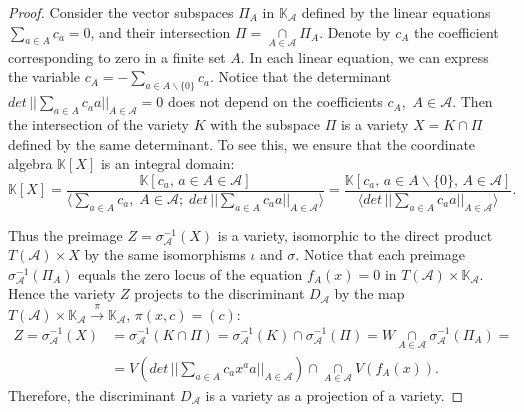 \documentclass[10pt,a4paper]{amsart}
\begin{document}
\begin{proof}
Consider the vector subspaces $\Pi_{A}$ in $\mathbb{K}_{\mathscr{A}}$
defined by the linear equations $\underset{a\in A}{\sum}c_{a}=0$,
and their intersection $\Pi=\underset{A\in\mathscr{A}}{\cap}\Pi_{A}$.
Denote by $c_{A}$ the coefficient corresponding to zero in a finite
set $A$. In each linear equation, we can express the variable $c_{A}=-\underset{a\in A\backslash\{0\}}{\sum}c_{a}.$
Notice that the determinant $det\,||\underset{a\in A}{\sum}c_{a}a||_{A\in\mathscr{A}}=0$
does not depend on the coefficients $c_{A},$ $A\in\mathscr{A}$.
Then the intersection of the variety $K$ with the subspace $\Pi$
is a variety $X=K\cap\Pi$ defined by the same determinant. To see
this, we ensure that the coordinate algebra $\mathbb{K}[X]$ is an
integral domain:
\[
\mathbb{K}[X]=\frac{\mathbb{K}[c_{a},\,a\in A\in\mathscr{A}]}{\langle\underset{a\in A}{\sum}c_{a},\;A\in\mathscr{A};\;det\,||\underset{a\in A}{\sum}c_{a}a||_{A\in\mathscr{A}}\rangle}=\frac{\mathbb{K}[c_{a},\,a\in A\backslash\{0\},\,A\in\mathscr{A}]}{\langle det\,||\underset{a\in A}{\sum}c_{a}a||_{A\in\mathscr{A}}\rangle}.
\]

Thus the preimage $Z=\sigma_{\mathscr{A}}^{-1}(X)$ is a variety,
isomorphic to the direct product $T(\mathscr{A})\times X$ by the
same isomorphisms $\iota$ and $\sigma$. Notice that each preimage
$\sigma_{\mathscr{A}}^{-1}(\Pi_{A})$ equals the zero locus of the
equation $f_{A}(x)=0$ in $T(\mathscr{A})\times\mathbb{K}_{\mathscr{A}}$.
Hence the variety $Z$ projects to the discriminant $D_{\mathscr{A}}$
by the map $T(\mathscr{A})\times\mathbb{K}_{\mathscr{A}}\overset{\pi}{\rightarrow}\mathbb{K}_{\mathscr{A}}$,
$\pi(x,c)=(c)$:
\begin{align*}
Z=\sigma_{\mathscr{A}}^{-1}(X) & =\sigma_{\mathscr{A}}^{-1}(K\cap\Pi)=\sigma_{\mathscr{A}}^{-1}(K)\cap\sigma_{\mathscr{A}}^{-1}(\Pi)=W\underset{A\in\mathscr{A}}{\cap}\sigma_{\mathscr{A}}^{-1}(\Pi_{A})=\\
 & =V(det\,||\underset{a\in A}{\sum}c_{a}x^{a}a||_{A\in\mathscr{A}})\cap\underset{A\in\mathscr{A}}{\cap}V(f_{A}(x)).
\end{align*}
Therefore, the discriminant $D_{\mathscr{A}}$ is a variety as a projection
of a variety.
\end{proof}
\end{document}
